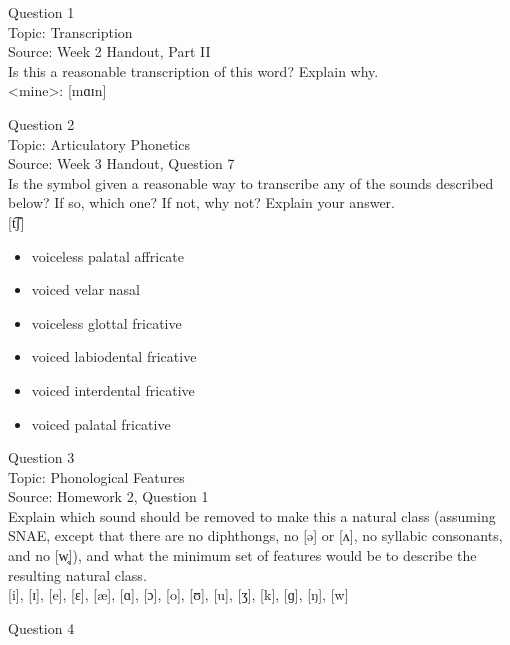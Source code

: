 \documentclass[12pt]{article}
\begin{document}
{\large Question 1}\\

Topic: Transcription\\
Source: Week 2 Handout, Part II\\

Is this a reasonable transcription of this word? Explain why.\\

<mine>: {[mɑɪn]}


\newpage

{\large Question 2}\\

Topic: Articulatory Phonetics\\
Source: Week 3 Handout, Question 7\\

Is the symbol given a reasonable way to transcribe any of the sounds described below? If so, which one? If not, why not? Explain your answer.\\

{[t͡ʃ]}

\begin{itemize} \item voiceless palatal affricate \item voiced velar nasal \item voiceless glottal fricative \item voiced labiodental fricative \item voiced interdental fricative \item voiced palatal fricative \end{itemize}


\newpage

{\large Question 3}\\

Topic: Phonological Features\\
Source: Homework 2, Question 1\\

Explain which sound should be removed to make this a natural class (assuming SNAE, except that there are no diphthongs, no [ə] or [ʌ], no syllabic consonants, and no [w̥]), and what the minimum set of features would be to describe the resulting natural class.\\

{[i]}, {[ɪ]}, {[e]}, {[ɛ]}, {[æ]}, {[ɑ]}, {[ɔ]}, {[o]}, {[ʊ]}, {[u]}, {[ʒ]}, {[k]}, {[ɡ]}, {[ŋ]}, {[w]}


\newpage

{\large Question 4}\\
\end{document}
